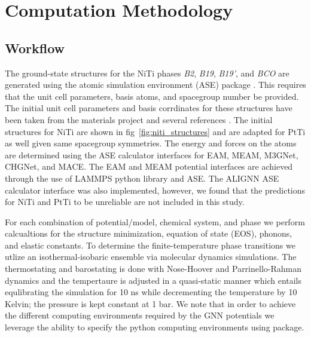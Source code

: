 \documentclass[preprint]{elsarticle}
\begin{document}
\section{Computation Methodology}
\label{sec:methods}

\subsection{Workflow}
\label{sec:workflow}
The ground-state structures for the NiTi phases \textit{B2}, \textit{B19}, \textit{B19'}, and \textit{BCO} are generated using the atomic simulation environment (ASE) package \cite{Larsen2017}. This requires that the unit cell parameters, basis atoms, and spacegroup number be provided. The initial unit cell parameters and basis corrdinates for these structures have been taken from the materials project \cite{Jain2013} and several references \cite{Haskins2016,Kadkhodaei2018}. The initial structures for NiTi are shown in fig~\ref{fig:niti_structures} and are adapted for PtTi as well given same spacegroup symmetries. The energy and forces on the atoms are determined using the ASE calculator interfaces for EAM, MEAM, M3GNet, CHGNet, and MACE.\cite{Mutter2010,Zhong2011,Ko2015,Kim2017,Chen2022,Deng2023,Batatia2022} The EAM and MEAM potential interfaces are achieved through the use of LAMMPS python library \cite{Thompson2022} and ASE. The ALIGNN ASE calculator interface was also implemented, however, we found that the predictions for NiTi and PtTi to be unreliable are not included in this study.\par

For each combination of potential/model, chemical system, and phase we perform calcualtions for the structure minimization, equation of state (EOS), phonons, and elastic constants. To determine the finite-temperature phase transitions we utlize an isothermal-isobaric ensemble via molecular dynamics simulations. The thermostating and barostating is done with Nose-Hoover and Parrinello-Rahman dynamics and the tempertaure is adjusted in a quasi-static manner which entails equlibrating the simulation for 10 ns while decrementing the temperature by 10 Kelvin; the pressure is kept constant at 1 bar. We note that in order to achieve the different computing environments required by the GNN potentials we leverage the ability to specify the python computing environments using \href{https://github.com/showyourwork/showyourwork}{\showyourwork} package.\par
\end{document}
